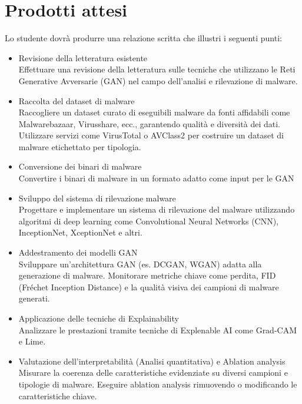 \section*{Prodotti attesi}

Lo studente dovrà produrre una relazione scritta che illustri i seguenti punti:

\begin{itemize}
    \item Revisione della letteratura esistente \\
    Effettuare una revisione della letteratura sulle tecniche che utilizzano le Reti Generative Avversarie (GAN) nel campo dell'analisi e rilevazione di malware. 
    
    \item Raccolta del dataset di malware \\
    Raccogliere un dataset curato di eseguibili malware da fonti affidabili come Malwarebazaar, Virusshare, ecc., garantendo qualità e diversità dei dati. Utilizzare servizi come VirusTotal o AVClass2 per costruire un dataset di malware etichettato per tipologia.

    \item Conversione dei binari di malware \\
    Convertire i binari di malware in un formato adatto come input per le GAN

    \item Sviluppo del sistema di rilevazione malware \\
    Progettare e implementare un sistema di rilevazione del malware utilizzando algoritmi di deep learning come Convolutional Neural Networks (CNN), InceptionNet, XceptionNet e altri.

    \item Addestramento dei modelli GAN \\
    Sviluppare un'architettura GAN (es. DCGAN, WGAN) adatta alla generazione di malware. Monitorare metriche chiave come perdita, FID (Fréchet Inception Distance) e la qualità visiva dei campioni di malware generati.

    \item Applicazione delle tecniche di Explainability \\
     Analizzare le prestazioni tramite tecniche di Explenable AI come Grad-CAM e Lime.

    \item Valutazione dell'interpretabilità (Analisi quantitativa) e Ablation analysis\\
    Misurare la coerenza delle caratteristiche evidenziate su diversi campioni e tipologie di malware. 
    Eseguire ablation analysis rimuovendo o modificando le caratteristiche chiave.

\end{itemize}
